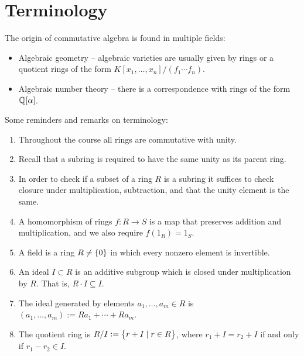 \documentclass[11pt,a4paper]{article}
\begin{document}
\maketitle


\newpage
\tableofcontents
\newpage

\setcounter{section}{-1}
\section{Terminology}

The origin of commutative algebra is found in multiple fields:
\begin{itemize}
  \item Algebraic geometry -- algebraic varieties are usually given
    by rings or a quotient rings of the form $K[x_1,\dots,x_n] / (f_1 \cdots f_n)$.
  \item Algebraic number theory --
    there is a correspondence with rings of the form $\mathbb{Q}[\alpha]$.
\end{itemize}

\begin{remark}[Terminology]
  Some reminders and remarks on terminology:
  \begin{enumerate}
    \item[(1)] Throughout the course all rings are commutative with unity.
    \item[(2)] Recall that a subring is required to have the same unity as its
      parent ring.
    \item[(3)] In order to check if a subset of a ring $R$ is a subring
      it suffices to check closure under multiplication, subtraction,
      and that the unity element is the same.
    \item[(4)] A homomorphism of rings $f \colon R \to S$
      is a map that preserves addition and multiplication,
      and we also require $f(1_R) = 1_S$.
    \item[(5)] A field is a ring $R \neq \left\{0\right\}$ in which every nonzero element
      is invertible.
    \item[(6)] An ideal $I \subset R$ is an additive subgroup which is closed
      under multiplication by $R$.
      That is, $R \cdot I \subseteq I$.
    \item[(7)] The ideal generated by elements $a_1,\dots,a_m \in R$ is
      $(a_1,\dots,a_m) := R a_1 + \cdots + R a_m$.
    \item[(8)] The quotient ring  is $R/I := \left\{r + I \mid r \in R\right\}$,
      where $r_1 + I = r_2 + I$ if and only if $r_1 - r_2 \in I$.
  \end{enumerate}
\end{remark}
\end{document}
